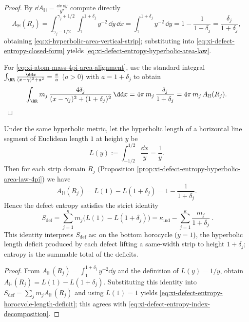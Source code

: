 \begin{proof}
By \(\dd A_{\mathbb{H}}=\frac{\dd x\,\dd y}{y^2}\) compute directly
\[
A_{\mathbb{H}}(R_j)
=\int_{\gamma_j-1/2}^{\gamma_j+1/2}\int_{1}^{1+\delta_j}y^{-2}\,\dd y\,\dd x
=\int_{1}^{1+\delta_j}y^{-2}\,\dd y
=1-\frac{1}{1+\delta_j}
=\frac{\delta_j}{1+\delta_j},
\]
obtaining \eqref{eq:xi-hyperbolic-area-vertical-strip}; substituting into \eqref{eq:xi-defect-entropy-closed-form} yields \eqref{eq:xi-defect-entropy-hyperbolic-area-law}.
\par
For \eqref{eq:xi-atom-mass-4pi-area-alignment}, use the standard integral
\(
\int_{\RR}\frac{\dd x}{(x-\gamma)^2+a^2}=\frac{\pi}{a}
\) (\(a>0\)) with \(a=1+\delta_j\) to obtain
\[
\int_{\RR} m_j\,\frac{4\delta_j}{(x-\gamma_j)^2+(1+\delta_j)^2}\,\dd x
=4\pi\,m_j\,\frac{\delta_j}{1+\delta_j}
=4\pi\,m_j\,A_{\mathbb{H}}(R_j).
\]
\end{proof}

\begin{corollary}\label{cor:xi-defect-entropy-horocycle-length-deficit}
Under the same hyperbolic metric, let the hyperbolic length of a horizontal line segment of Euclidean length \(1\) at height \(y\) be
\[
L(y):=\int_{-1/2}^{1/2}\frac{\dd x}{y}=\frac{1}{y}.
\]
Then for each strip domain \(R_j\) (Proposition \ref{prop:xi-defect-entropy-hyperbolic-area-law-4pi}) we have
\[
A_{\mathbb{H}}(R_j)=L(1)-L(1+\delta_j)=1-\frac{1}{1+\delta_j}.
\]
Hence the defect entropy satisfies the strict identity
\begin{equation}\label{eq:xi-defect-entropy-horocycle-length-deficit}
\boxed{\;
S_{\mathrm{def}}
=\sum_{j=1}^{\kappa}m_j\bigl(L(1)-L(1+\delta_j)\bigr)
=\kappa_{\mathrm{ind}}-\sum_{j=1}^{\kappa}\frac{m_j}{1+\delta_j}\; }.
\end{equation}
This identity interprets \(S_{\mathrm{def}}\) as: on the bottom horocycle (\(y=1\)), the hyperbolic length deficit produced by each defect lifting a same-width strip to height \(1+\delta_j\); entropy is the summable total of the deficits.
\end{corollary}

\begin{proof}
From \(A_{\mathbb{H}}(R_j)=\int_{1}^{1+\delta_j}y^{-2}\dd y\) and the definition of \(L(y)=1/y\), obtain
\(
A_{\mathbb{H}}(R_j)=L(1)-L(1+\delta_j)
\).
Substituting this identity into
\(
S_{\mathrm{def}}=\sum_j m_jA_{\mathbb{H}}(R_j)
\)
and using \(L(1)=1\) yields \eqref{eq:xi-defect-entropy-horocycle-length-deficit};
this agrees with \eqref{eq:xi-defect-entropy-index-decomposition}.
\end{proof}

